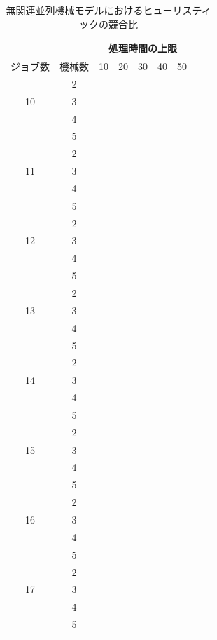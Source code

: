 \documentclass[12pt]{optlab-bachelor}
\begin{document}
\begin{table}[htb]
  \begin{center}
    \begin{tabular}{|c|c|c|c|c|c|c|c|c|} \hline
      &  & \multicolumn{5}{c|}{処理時間の上限} \\ \hline
      ジョブ数 & 機械数& 10 & 20 & 30 & 40 & 50 \\ \hline \hline
      & 2 &  &  &  &  &    \\ \cline{2-7}
      10 & 3 &  &  &  &  &    \\ \cline{2-7}
      & 4 &  &  &  &  &    \\ \cline{2-7}
      & 5 &  &  &  &  &    \\ \hline \hline
      & 2 &  &  &  &  &    \\ \cline{2-7}
      11 & 3 &  &  &  &   &  \\ \cline{2-7}
      & 4 &  &  &  &  &    \\ \cline{2-7}
      & 5 &  &  &  &  &    \\ \hline \hline
      & 2 &  &  &  &  &    \\ \cline{2-7}
      12 & 3 &  &  &  &  &  \\ \cline{2-7}
      & 4 &  &  &  &  &    \\ \cline{2-7}
      & 5 &  &  &  &  &   \\ \hline \hline
      & 2 &  &  &  &  &  \\ \cline{2-7}
      13 & 3 &  &  &  &  &  \\ \cline{2-7}
      & 4 &  &  &  &  &  \\ \cline{2-7}
      & 5 &  &  &  &  &  \\ \hline \hline
      & 2 &  &  &  &  &  \\ \cline{2-7}
      14 & 3 &  &  &  &  &  \\ \cline{2-7}
      & 4 &  &  &  &  &  \\ \cline{2-7}
      & 5 &  &  &  &  &  \\ \hline \hline
      & 2 &  &  &  &  &  \\ \cline{2-7}
      15 & 3 &  &  &  &  &  \\ \cline{2-7}
      & 4 &  &  &  &  &  \\ \cline{2-7}
      & 5 &  &  &  &  &  \\ \hline \hline
      & 2 &  &  &  &  &  \\ \cline{2-7}
      16 & 3 &  &  &  &  &  \\ \cline{2-7}
      & 4 &  &  &  &  &  \\ \cline{2-7}
      & 5 &  &  &  &  &  \\ \hline \hline
      & 2 &  &  &  &  &  \\ \cline{2-7}
      17 & 3 &  &  &  &  &  \\ \cline{2-7}
      & 4 &  &  &  &  &  \\ \cline{2-7}
      & 5 &  &  &  &  &  \\ \hline \hline
    \end{tabular}
    \caption{無関連並列機械モデルにおけるヒューリスティックの競合比}
    \label{A7}
  \end{center}
\end{table}
\end{document}
